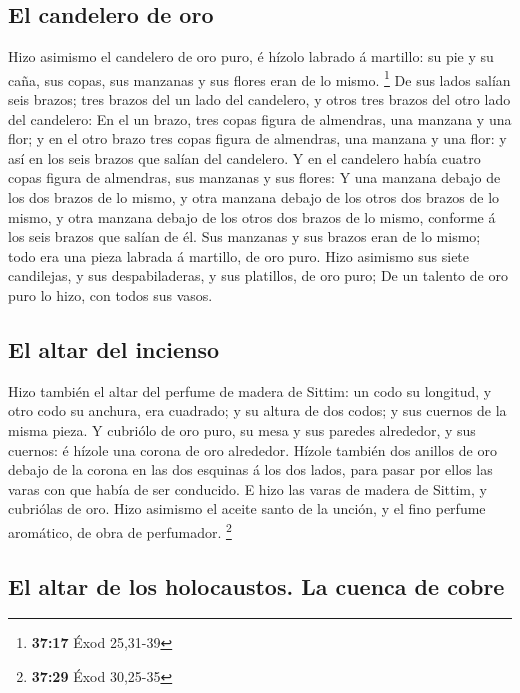 \hypertarget{el-candelero-de-oro}{%
\subsection{El candelero de oro}\label{el-candelero-de-oro}}

 Hizo asimismo el candelero de oro puro, é hízolo labrado á
martillo: su pie y su caña, sus copas, sus manzanas y sus flores eran de
lo mismo. \footnote{\textbf{37:17} Éxod 25,31-39}  De sus
lados salían seis brazos; tres brazos del un lado del candelero, y otros
tres brazos del otro lado del candelero:  En el un brazo,
tres copas figura de almendras, una manzana y una flor; y en el otro
brazo tres copas figura de almendras, una manzana y una flor: y así en
los seis brazos que salían del candelero.  Y en el
candelero había cuatro copas figura de almendras, sus manzanas y sus
flores:  Y una manzana debajo de los dos brazos de lo
mismo, y otra manzana debajo de los otros dos brazos de lo mismo, y otra
manzana debajo de los otros dos brazos de lo mismo, conforme á los seis
brazos que salían de él.  Sus manzanas y sus brazos eran de
lo mismo; todo era una pieza labrada á martillo, de oro puro.
 Hizo asimismo sus siete candilejas, y sus despabiladeras,
y sus platillos, de oro puro;  De un talento de oro puro lo
hizo, con todos sus vasos.

\hypertarget{el-altar-del-incienso}{%
\subsection{El altar del incienso}\label{el-altar-del-incienso}}

 Hizo también el altar del perfume de madera de Sittim: un
codo su longitud, y otro codo su anchura, era cuadrado; y su altura de
dos codos; y sus cuernos de la misma pieza.  Y cubriólo de
oro puro, su mesa y sus paredes alrededor, y sus cuernos: é hízole una
corona de oro alrededor.  Hízole también dos anillos de oro
debajo de la corona en las dos esquinas á los dos lados, para pasar por
ellos las varas con que había de ser conducido.  E hizo las
varas de madera de Sittim, y cubriólas de oro.  Hizo
asimismo el aceite santo de la unción, y el fino perfume aromático, de
obra de perfumador. \footnote{\textbf{37:29} Éxod 30,25-35}

\hypertarget{el-altar-de-los-holocaustos.-la-cuenca-de-cobre}{%
\subsection{El altar de los holocaustos. La cuenca de
cobre}\label{el-altar-de-los-holocaustos.-la-cuenca-de-cobre}}

